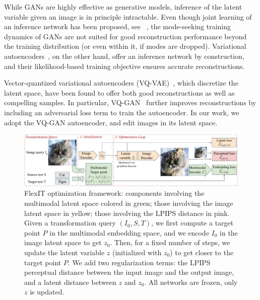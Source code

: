 While GANs are highly effective as generative models, inference of the latent variable 
given an image is in principle intractable.
Even though joint learning of an inference network has been proposed, see \eg
 ~\cite{donahue17iclr,dumoulin17iclr}, the mode-seeking training dynamics of GANs are 
 not suited for good reconstruction performance beyond the training distribution 
 (or even within it, if modes are dropped).
Variational autoencoders~\cite{kingma14iclr}, on the other hand,  offer an inference 
network by construction, and their likelihood-based training objective ensures accurate 
reconstructions.

Vector-quantized  variational autoencoders (VQ-VAE)~\cite{oord17nips,razavi19nips},
 which discretize the latent space, have been found to offer both good reconstructions 
 as well as compelling samples. 
In particular, VQ-GAN~\cite{esser2021taming,yu21arxiv} further improves reconstructions 
by  including an adversarial loss term to train the autoencoder.
In our work,  we adopt the VQ-GAN autoencoder,  and edit  images in its latent space.


\begin{figure}
    \centering
    \vspace{-1em}
    \includegraphics[width=\linewidth]{images/flexit/assets/method.pdf}
    \caption{FlexIT optimization framework: components  involving the multimodal latent space  colored in green; those involving the image latent space in yellow; those involving the LPIPS distance in pink. Given a transformation query $(I_0, S, T)$, we first compute a target point $P$ in the multimodal embedding space, and we encode $I_0$ in the image latent space to get $z_0$. Then, for a fixed number of steps, we update the latent variable $z$ (initialized with $z_0$) to get closer to the target point $P$. 
    We  add two regularization terms: the LPIPS perceptual distance between the input image and the output image, and a latent distance between $z$ and $z_0$. All networks are frozen, only $z$ is updated.}
    \label{fig:method}
    \vspace{-1em}
\end{figure}


